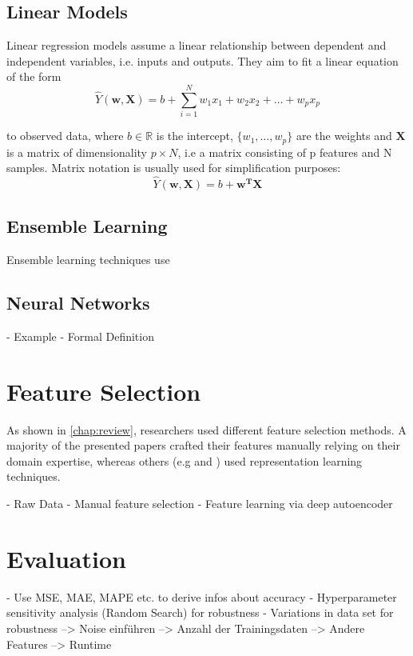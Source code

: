 \newpage
\subsection{Linear Models}
Linear regression models assume a linear relationship between dependent and independent variables, i.e. inputs and outputs. They aim to fit a linear equation of the form 
\begin{equation}
\hat Y(\mathbf{w},\mathbf{X}) = b + \sum_{i=1}^N w_1x_1 + w_2x_2 + \dots + w_px_p	
\end{equation}

to observed data, where $b \in \mathbb{R}$ is the intercept, $\{w_1, \dots, w_p\}$ are the weights and $\mathbf{X}$ is a matrix of dimensionality $p \times N$, i.e a matrix consisting of p features and N samples. Matrix notation is usually used for simplification purposes: 
\begin{equation}
	\hat Y(\mathbf{w},\mathbf{X}) = b + \mathbf{w^T}\mathbf{X}
\end{equation}

\subsection{Ensemble Learning}

Ensemble learning techniques use 
\subsection{Neural Networks}
- Example
- Formal Definition

\section{Feature Selection}

As shown in \autoref{chap:review}, researchers used different feature selection methods. A majority of the presented papers crafted their features manually relying on their domain expertise, whereas others (e.g \cite{Siripanpornchana2016_AnnWithDbnFS} and \cite{Huang2018_GBDT}) used representation learning techniques.


- Raw Data 
- Manual feature selection
- Feature learning via deep autoencoder

\section{Evaluation} 
- Use MSE, MAE, MAPE etc. to derive infos about accuracy
- Hyperparameter sensitivity analysis (Random Search) for robustness
- Variations in data set for robustness
--> Noise einführen 
--> Anzahl der Trainingsdaten
--> Andere Features
--> Runtime